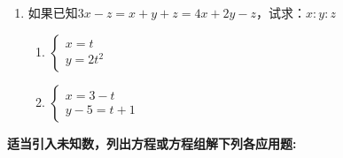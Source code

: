 \begin{enumerate}
\item 如果已知$3x-z=x+y+z=4x+2y-z$，试求：$x:y:z$
\begin{multicols}{2}
\begin{enumerate}
    \item $\begin{cases}
        x=t\\ y=2t^2
    \end{cases}$
    \item $\begin{cases}
        x=3-t\\ y-5=t+1
    \end{cases}$
\end{enumerate}
\end{multicols}

\end{enumerate}

\textbf{适当引入未知数，列出方程或方程组解下列各应用题:
}

